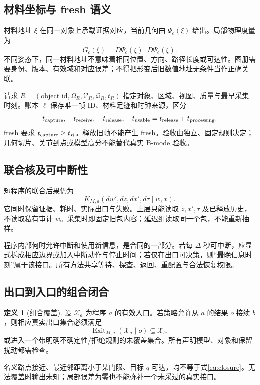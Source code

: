 \documentclass[11pt,a4paper,fontset=fandol]{ctexart}
\theoremstyle{definition}
\newtheorem{definition}[theorem]{定义}
\theoremstyle{remark}\newtheorem{remark}[theorem]{说明}
\numberwithin{equation}{section}
\begin{document}
\subsection{材料坐标与 fresh 语义}
材料地址 $\xi$ 在同一对象上承载证据对应，当前几何由 $\Psi_c(\xi)$ 给出。局部物理度量为
\begin{equation}
 G_c(\xi)=D\Psi_c(\xi)^\top D\Psi_c(\xi).
\end{equation}
不同姿态下，同一材料地址不意味着相同位置、方向、路径长度或可达性。图册需要身份、版本、有效域和对应误差；不得把形变后旧数值地址无条件当作正确关联。

请求 $R=(\mathrm{object\_id},\Omega_R,\mathcal V_R,\mathcal Q_R,t_R)$ 指定对象、区域、视图、质量与最早采集时刻。账本 $\ell$ 保存唯一帧 ID、材料足迹和时钟来源，区分
\begin{equation}
 t_{\rm capture},\quad t_{\rm receive},\quad t_{\rm release},\quad
 t_{\rm usable}=t_{\rm release}+t_{\rm processing}.
\end{equation}
fresh 要求 $t_{\rm capture}\ge t_R$。释放旧帧不能产生 fresh。验收由独立、固定规则决定；几何切片、关节到点或模型高分不能替代真实 B-mode 验收。

\subsection{联合核及可中断性}
短程序的联合后果仍为
\begin{equation}
 K_{M,a}(dw',dz,dx',d\tau\mid w,x).
 \label{eq:kernel}
\end{equation}
它同时保留证据、耗时、实际出口与失败。上层只能读取 $z,x',\tau$ 及已释放历史，不读取私有审计 $w$。采集时即固定旧包内容；延迟组读取同一个包，不能重新抽样。

程序内部何时允许中断和使用新信息，是合同的一部分。若每 $\Delta$ 秒可中断，应显式拆成相应边界或加入中断动作与停止时间；若仅在出口可决策，则“最晚信息时刻”属于该接口。所有方法共享等待、探查、返回、重配置与合法恢复权限。

\subsection{出口到入口的组合闭合}
\begin{definition}[组合覆盖]
设 $\mathcal X_a$ 为程序 $a$ 的有效入口。若策略允许从 $a$ 的结果 $o$ 接续 $b$，则相应真实出口集合必须满足
\begin{equation}
 \operatorname{Exit}_{M,a}(\mathcal X_a\mid o)
 \subseteq \mathcal X_b,
 \label{eq:closure}
\end{equation}
或进入一个带明确不确定性/拒绝规则的未覆盖集合。所有声明模型、对象和保留扰动都需检查。
\end{definition}
名义路点接近、最近邻距离小于某门限、目标 $q$ 可达，均不等于式\eqref{eq:closure}。无法覆盖时输出未知；局部误差为零也不能弥补一个未采过的真实接口。
\end{document}
